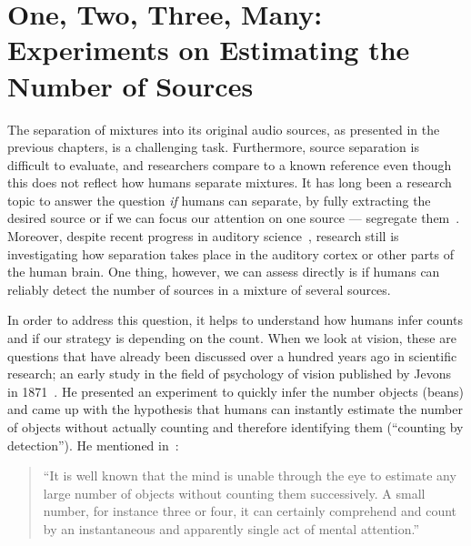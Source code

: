 \chapter[Experiments on Estimating the Number of Sources]{One, Two, Three, Many: Experiments on Estimating the Number of Sources}
\label{cha:countanalysis}
\bigskip
\bigskip
\bigskip
\bigskip
%
The separation of mixtures into its original audio sources, as presented in the previous chapters, is a challenging task.
Furthermore, source separation is difficult to evaluate, and researchers compare to a known reference even though this does not reflect how humans separate mixtures.
It has long been a research topic to answer the question \emph{if} humans can separate, by fully extracting the desired source or if we can focus our attention on one source --- segregate them~\cite{bregman}.
Moreover, despite recent progress in auditory science~\cite{carlyon04, koelsch05, rabinowitz13}, research still is investigating how separation takes place in the auditory cortex or other parts of the human brain.
One thing, however, we can assess directly is if humans can reliably detect the number of sources in a mixture of several sources.
\par
In order to address this question, it helps to understand how humans infer counts and if our strategy is depending on the count.
When we look at vision, these are questions that have already been discussed over a hundred years ago in scientific research; an early study in the field of psychology of vision published by Jevons in 1871~\cite{jevons1871}. 
He presented an experiment to quickly infer the number objects (beans) and came up with the hypothesis that humans can instantly estimate the number of objects without actually counting and therefore identifying them (``counting by detection'').
He mentioned in~\cite{jevons1871}:

\begin{quote}
``It is well known that the mind is unable through the eye to estimate any large number of objects without  counting them successively. A small number, for instance three or four, it can certainly comprehend and count by an instantaneous and apparently single act of mental attention.''
\end{quote}

